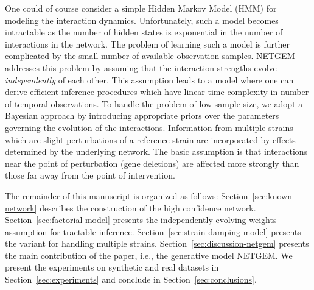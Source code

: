 \documentclass{bioinfo}
\begin{document}
One could of course consider a simple Hidden Markov Model (HMM) for
modeling the interaction dynamics. Unfortunately, such a model becomes
intractable as the number of hidden states is exponential in the
number of interactions in the network. The problem of learning such a
model is further complicated by the small number of available
observation samples. NETGEM addresses this problem by assuming that
the interaction strengths evolve \emph{independently} of each other. 
This assumption leads to a model where one can derive efficient inference 
procedures which have linear time complexity 
in number of temporal observations. To handle the problem of low
sample size,  we adopt a Bayesian approach by introducing appropriate
priors over the parameters 
governing the evolution of the interactions.  Information from
multiple strains which are slight perturbations of a reference strain
are incorporated by effects determined by the underlying network. The
basic assumption is that interactions near the point of perturbation
(gene deletions) are affected more strongly than those far away from
the point of intervention. 

The remainder of this manuscript is organized as follows:
Section~\ref{sec:known-network} describes the construction of the
high confidence network. Section~\ref{sec:factorial-model} presents
the independently evolving weights assumption for tractable inference.
Section~\ref{sec:strain-damping-model} 
presents the variant for handling multiple strains.  
Section~\ref{sec:discussion-netgem} presents the main contribution of
the paper, i.e., the generative model NETGEM. We present the
experiments on synthetic and real datasets in
Section~\ref{sec:experiments} and conclude in Section~\ref{sec:conclusions}.
\end{document}
